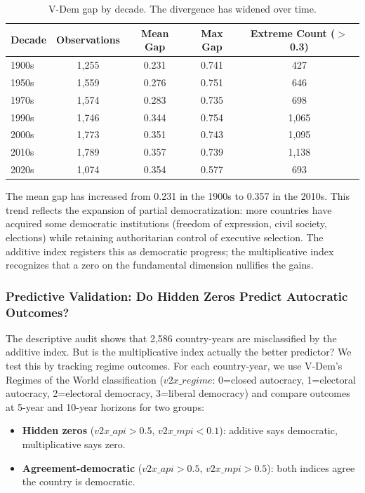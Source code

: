 \documentclass[12pt]{article}
\begin{document}
\begin{table}[h]
\centering
\begin{tabular}{@{}lcccc@{}}
\toprule
Decade & Observations & Mean Gap & Max Gap & Extreme Count ($>$0.3) \\
\midrule
1900s & 1,255 & 0.231 & 0.741 & 427 \\
1950s & 1,559 & 0.276 & 0.751 & 646 \\
1970s & 1,574 & 0.283 & 0.735 & 698 \\
1990s & 1,746 & 0.344 & 0.754 & 1,065 \\
2000s & 1,773 & 0.351 & 0.743 & 1,095 \\
2010s & 1,789 & 0.357 & 0.739 & 1,138 \\
2020s & 1,074 & 0.354 & 0.577 & 693 \\
\bottomrule
\end{tabular}
\caption{V-Dem gap by decade. The divergence has widened over time.}
\label{tab:vdem_decades}
\end{table}

The mean gap has increased from 0.231 in the 1900s to 0.357 in the 2010s. This trend reflects the expansion of partial democratization: more countries have acquired some democratic institutions (freedom of expression, civil society, elections) while retaining authoritarian control of executive selection. The additive index registers this as democratic progress; the multiplicative index recognizes that a zero on the fundamental dimension nullifies the gains.

\subsubsection{Predictive Validation: Do Hidden Zeros Predict Autocratic Outcomes?}

The descriptive audit shows that 2,586 country-years are misclassified by the additive index. But is the multiplicative index actually the better predictor? We test this by tracking regime outcomes. For each country-year, we use V-Dem's Regimes of the World classification ($v2x\_regime$: 0=closed autocracy, 1=electoral autocracy, 2=electoral democracy, 3=liberal democracy) and compare outcomes at 5-year and 10-year horizons for two groups:

\begin{itemize}
\item \textbf{Hidden zeros} ($v2x\_api > 0.5$, $v2x\_mpi < 0.1$): additive says democratic, multiplicative says zero.
\item \textbf{Agreement-democratic} ($v2x\_api > 0.5$, $v2x\_mpi > 0.5$): both indices agree the country is democratic.
\end{itemize}
\end{document}
